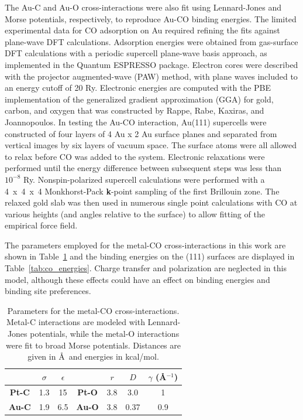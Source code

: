 \documentclass[journal = jpccck, manuscript = article]{achemso}
\begin{document}
The Au-C and Au-O cross-interactions were also fit using Lennard-Jones and
Morse potentials, respectively, to reproduce Au-CO binding energies.
The limited experimental data for CO adsorption on Au required refining the fits against plane-wave DFT calculations.
Adsorption energies were obtained from gas-surface DFT calculations with a
periodic supercell plane-wave basis approach, as implemented in the
Quantum ESPRESSO package.\cite{QE-2009} Electron cores were
described with the projector augmented-wave (PAW)
method,\cite{PhysRevB.50.17953,PhysRevB.59.1758} with plane waves
included to an energy cutoff of 20 Ry. Electronic energies are
computed with the PBE implementation of the generalized gradient
approximation (GGA) for gold, carbon, and oxygen that was constructed
by Rappe, Rabe, Kaxiras, and Joannopoulos.\cite{Perdew_GGA,RRKJ_PP}
In testing the Au-CO interaction, Au(111) supercells were constructed of four layers of 4
Au x 2 Au surface planes and separated from vertical images by six
layers of vacuum space. The surface atoms were all allowed to relax 
before CO was added to the system. Electronic relaxations were 
performed until the energy difference between subsequent steps 
was less than $10^{-8}$ Ry.   Nonspin-polarized supercell calculations 
were performed with a 4~x~4~x~4 Monkhorst-Pack {\bf k}-point sampling of the first Brillouin
zone.\cite{Monkhorst:1976} The relaxed gold slab was
then used in numerous single point calculations with CO at various
heights (and angles relative to the surface) to allow fitting of the
empirical force field.

The parameters employed for the metal-CO cross-interactions in this work 
are shown in Table~\ref{tab:co_parameters} and the binding energies on the 
(111) surfaces are displayed in Table~\ref{tab:co_energies}.  Charge transfer
and polarization are neglected in this model, although these effects could have 
an effect on binding energies and binding site preferences.

\begin{table}[H]
  \caption{Parameters for the metal-CO cross-interactions. Metal-C
    interactions are modeled with Lennard-Jones potentials, while the
    metal-O interactions were fit to broad Morse
    potentials.  Distances are given in \AA~and energies in kcal/mol. }
\centering
\begin{tabular}{| c | cc | c | ccc |}
\hline
 &  $\sigma$ & $\epsilon$ & & $r$ & $D$ & $\gamma$ (\AA$^{-1}$) \\
\hline
\textbf{Pt-C} & 1.3 & 15  & \textbf{Pt-O} & 3.8 & 3.0 & 1 \\
\textbf{Au-C} & 1.9 & 6.5  & \textbf{Au-O} & 3.8 & 0.37 & 0.9\\

\hline
\end{tabular}
\label{tab:co_parameters}
\end{table}
\end{document}
